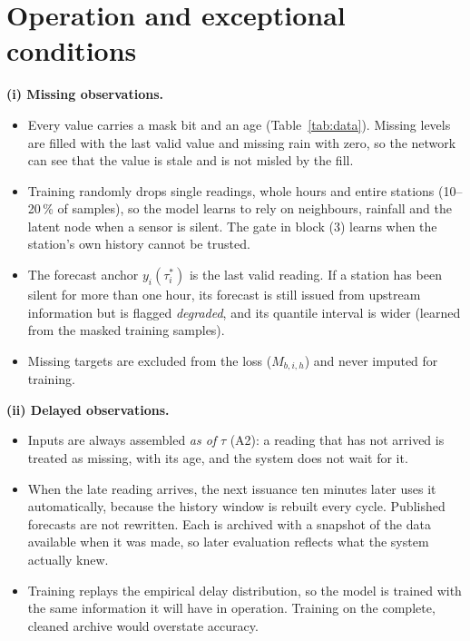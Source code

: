 \section{Operation and exceptional conditions}
\textbf{(i) Missing observations.}
\begin{itemize}[leftmargin=*,itemsep=1pt]
\item Every value carries a mask bit and an age (Table~\ref{tab:data}). Missing levels are filled
with the last valid value and missing rain with zero, so the network can see that the value is
stale and is not misled by the fill.
\item Training randomly drops single readings, whole hours and entire stations (10--20\,\% of
samples), so the model learns to rely on neighbours, rainfall and the latent node when a sensor is
silent. The gate in block (3) learns when the station's own history cannot be trusted.
\item The forecast anchor $y_i(\tau^{\ast}_i)$ is the last valid reading. If a station has been
silent for more than one hour, its forecast is still issued from upstream information but is
flagged \emph{degraded}, and its quantile interval is wider (learned from the masked training
samples).
\item Missing targets are excluded from the loss ($M_{b,i,h}$) and never imputed for training.
\end{itemize}

\textbf{(ii) Delayed observations.}
\begin{itemize}[leftmargin=*,itemsep=1pt]
\item Inputs are always assembled \emph{as of} $\tau$ (A2): a reading that has not arrived is
treated as missing, with its age, and the system does not wait for it.
\item When the late reading arrives, the next issuance ten minutes later uses it automatically,
because the history window is rebuilt every cycle. Published forecasts are not rewritten. Each is
archived with a snapshot of the data available when it was made, so later evaluation reflects what
the system actually knew.
\item Training replays the empirical delay distribution, so the model is trained with the same
information it will have in operation. Training on the complete, cleaned archive would overstate
accuracy.
\end{itemize}

